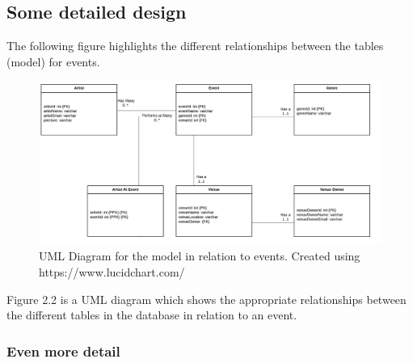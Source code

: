 \subsection{Some detailed design}
The following figure highlights the different relationships between the tables (model) for events.
\begin{figure}[H]
\includegraphics[width=\textwidth,height=\textheight,keepaspectratio]{images/events}
\caption{UML Diagram for the model in relation to events. Created using https://www.lucidchart.com/}
\end{figure}
Figure 2.2  is a UML diagram which shows the appropriate relationships between the different tables in the database in relation to an event.
\subsubsection{Even more detail}

